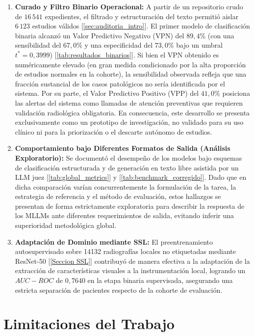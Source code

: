 \documentclass[../tesis.tex]{subfiles}
\begin{document}
\begin{enumerate}    
    \item \textbf{Curado y Filtro Binario Operacional:} A partir de un repositorio crudo de $16\,541$ expedientes, el filtrado y estructuración del texto permitió aislar $6\,123$ estudios válidos [\autoref{sec:auditoria_intro}]. El primer modelo de clasificación binaria alcanzó un Valor Predictivo Negativo (VPN) del $89{,}4\%$ (con una sensibilidad del $67{,}0\%$ y una especificidad del $73{,}0\%$ bajo un umbral $t^* = 0{,}3999$) [\autoref{tab:resultados_binarios}]. Si bien el VPN obtenido es numéricamente elevado (en gran medida condicionado por la alta proporción de estudios normales en la cohorte), la sensibilidad observada refleja que una fracción sustancial de los casos patológicos no sería identificada por el sistema. Por su parte, el Valor Predictivo Positivo (VPP) del $41{,}0\%$ posiciona las alertas del sistema como llamadas de atención preventivas que requieren validación radiológica obligatoria. En consecuencia, este desarrollo se presenta exclusivamente como un prototipo de investigación, no validado para su uso clínico ni para la priorización o el descarte autónomo de estudios. 
    
    \item \textbf{Comportamiento bajo Diferentes Formatos de Salida (Análisis Exploratorio):} Se documentó el desempeño de los modelos bajo esquemas de clasificación estructurada y de generación en texto libre asistida por un LLM juez [\autoref{tab:global_metrics}] y [\autoref{tab:benchmark_corregido}]. Dado que en dicha comparación varían concurrentemente la formulación de la tarea, la estrategia de referencia y el método de evaluación, estos hallazgos se presentan de forma estrictamente exploratoria para describir la respuesta de los MLLMs ante diferentes requerimientos de salida, evitando inferir una superioridad metodológica global. 

    \item \textbf{Adaptación de Dominio mediante SSL:} El preentrenamiento autosupervisado sobre 14132 radiografías locales no etiquetadas mediante ResNet-50 [\autoref{Seccion SSL}] contribuyó de manera efectiva a la adaptación de la extracción de características visuales a la instrumentación local, logrando un $AUC-ROC$ de $0{,}7640$ en la etapa binaria supervisada, asegurando una estricta separación de pacientes respecto de la cohorte de evaluación.
\end{enumerate}

\section{Limitaciones del Trabajo}
\end{document}

